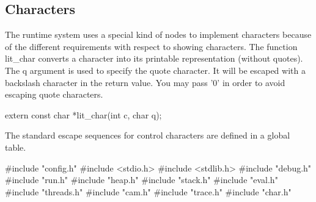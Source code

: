 %
%
\subsection{Characters}
The runtime system uses a special kind of nodes to implement
characters because of the different requirements with respect to
showing characters. The function {\Tt{}lit{\_}char\nwendquote} converts a character
into its printable representation (without quotes). The {\Tt{}q\nwendquote} argument
is used to specify the quote character. It will be escaped with a
backslash character in the return value. You may pass {\Tt{}'{\nwbackslash}0'\nwendquote} in
order to avoid escaping quote characters.

\nwenddocs{}\endmoddef\nwstartdeflinemarkup\nwenddeflinemarkup
extern const char *lit_char(int c, char q);

\nwendcode{}\nwdocspar
The standard escape sequences for control characters are defined in
a global table.

\nwenddocs{}\endmoddef\nwstartdeflinemarkup{}\nwenddeflinemarkup
#include "config.h"
#include <stdio.h>
#include <stdlib.h>
#include "debug.h"
#include "run.h"
#include "heap.h"
#include "stack.h"
#include "eval.h"
#include "threads.h"
#include "cam.h"
#include "trace.h"
#include "char.h"


